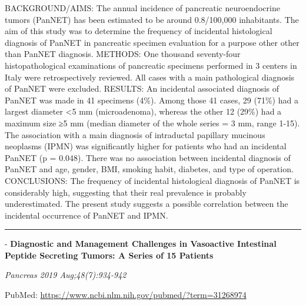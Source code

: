 \documentclass[]{article}
\begin{document}
BACKGROUND/AIMS: The annual incidence of pancreatic neuroendocrine
tumors (PanNET) has been estimated to be around 0.8/100,000 inhabitants.
The aim of this study was to determine the frequency of incidental
histological diagnosis of PanNET in pancreatic specimen evaluation for a
purpose other other than PanNET diagnosis. METHODS: One thousand
seventy-four histopathological examinations of pancreatic specimens
performed in 3 centers in Italy were retrospectively reviewed. All cases
with a main pathological diagnosis of PanNET were excluded. RESULTS: An
incidental associated diagnosis of PanNET was made in 41 specimens
(4\%). Among those 41 cases, 29 (71\%) had a largest diameter
\textless{}5 mm (microadenoma), whereas the other 12 (29\%) had a
maximum size ≥5 mm (median diameter of the whole series = 3 mm, range
1-15). The association with a main diagnosis of intraductal papillary
mucinous neoplasms (IPMN) was significantly higher for patients who had
an incidental PanNET (p = 0.048). There was no association between
incidental diagnosis of PanNET and age, gender, BMI, smoking habit,
diabetes, and type of operation. CONCLUSIONS: The frequency of
incidental histological diagnosis of PanNET is considerably high,
suggesting that their real prevalence is probably underestimated. The
present study suggests a possible correlation between the incidental
occurrence of PanNET and IPMN.

{}

{}

\begin{center}\rule{0.5\linewidth}{\linethickness}\end{center}

 - \textbf{Diagnostic and Management Challenges in Vasoactive Intestinal
Peptide Secreting Tumors: A Series of 15 Patients}

\emph{Pancreas 2019 Aug;48(7):934-942}

PubMed: \url{https://www.ncbi.nlm.nih.gov/pubmed/?term=31268974}
\end{document}
